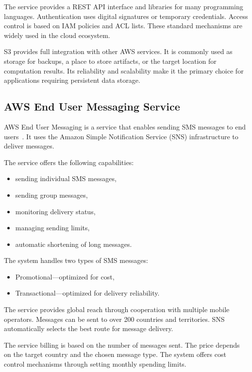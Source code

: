 The service provides a REST API interface and libraries for many programming languages.
Authentication uses digital signatures or temporary credentials.
Access control is based on IAM policies and ACL lists.
These standard mechanisms are widely used in the cloud ecosystem.

S3 provides full integration with other AWS services.
It is commonly used as storage for backups, a place to store artifacts, or the target location for computation results.
Its reliability and scalability make it the primary choice for applications requiring persistent data storage.

\subsection{AWS End User Messaging Service}\label{subsec:amazon-sns}

AWS End User Messaging is a service that enables sending SMS messages to end users~\cite{aws_messaging}.
It uses the Amazon Simple Notification Service (SNS) infrastructure to deliver messages.

The service offers the following capabilities:
\begin{itemize}
    \item sending individual SMS messages,
    \item sending group messages,
    \item monitoring delivery status,
    \item managing sending limits,
    \item automatic shortening of long messages.
\end{itemize}

The system handles two types of SMS messages:
\begin{itemize}
    \item Promotional—optimized for cost,
    \item Transactional—optimized for delivery reliability.
\end{itemize}

The service provides global reach through cooperation with multiple mobile operators.
Messages can be sent to over 200 countries and territories.
SNS automatically selects the best route for message delivery.

The service billing is based on the number of messages sent.
The price depends on the target country and the chosen message type.
The system offers cost control mechanisms through setting monthly spending limits.

